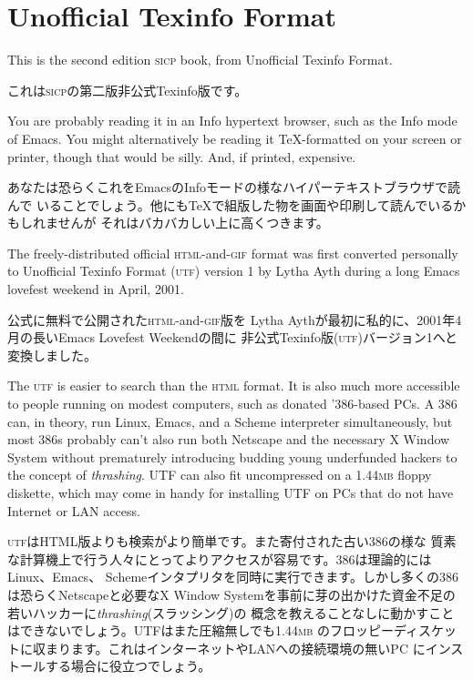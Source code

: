 \documentclass[oneside]{book}
\newcommand{\acronym}[1]{\textsc{\MakeLowercase{#1}}}
\newcommand{\newterm}[1]{\index{#1}\emph{#1}}
\begin{document}
\pagebreak

\tableofcontents

\small  %


\label{UTF}
\chapter*{Unofficial Texinfo Format}

This is the second edition \acronym{SICP} book, from Unofficial Texinfo
Format.

これは\acronym{SICP}の第二版非公式Texinfo版です。

You are probably reading it in an Info hypertext browser, such as the Info
mode of Emacs.  You might alternatively be reading it {\TeX}-formatted on your
screen or printer, though that would be silly.  And, if printed, expensive.

あなたは恐らくこれをEmacsのInfoモードの様なハイパーテキストブラウザで読んで
いることでしょう。他にも{\TeX}で組版した物を画面や印刷して読んでいるかもしれませんが
それはバカバカしい上に高くつきます。

The freely-distributed official \acronym{HTML}-and-\acronym{GIF} format was
first converted personally to Unofficial Texinfo Format (\acronym{UTF})
version 1 by Lytha Ayth during a long Emacs lovefest weekend in April, 2001.

公式に無料で公開された\acronym{HTML}-and-\acronym{GIF}版を
Lytha Aythが最初に私的に、2001年4月の長いEmacs Lovefest Weekendの間に
非公式Texinfo版(\acronym{UTF})バージョン1へと変換しました。

The \acronym{UTF} is easier to search than the \acronym{HTML} format.  It is
also much more accessible to people running on modest computers, such as
donated '386-based PCs.  A 386 can, in theory, run Linux, Emacs, and a Scheme
interpreter simultaneously, but most 386s probably can't also run both Netscape
and the necessary X Window System without prematurely introducing budding young
underfunded hackers to the concept of \newterm{thrashing}.  UTF can also fit
uncompressed on a 1.44\acronym{MB} floppy diskette, which may come in handy for
installing UTF on PCs that do not have Internet or LAN access.

\acronym{UTF}はHTML版よりも検索がより簡単です。また寄付された古い386の様な
質素な計算機上で行う人々にとってよりアクセスが容易です。386は理論的にはLinux、Emacs、
Schemeインタプリタを同時に実行できます。しかし多くの386は恐らくNetscapeと必要なX Window
Systemを事前に芽の出かけた資金不足の若いハッカーに\newterm{thrashing}(スラッシング)の
概念を教えることなしに動かすことはできないでしょう。UTFはまた圧縮無しでも1.44\acronym{MB}
のフロッピーディスケットに収まります。これはインターネットやLANへの接続環境の無いPC
にインストールする場合に役立つでしょう。
\end{document}
